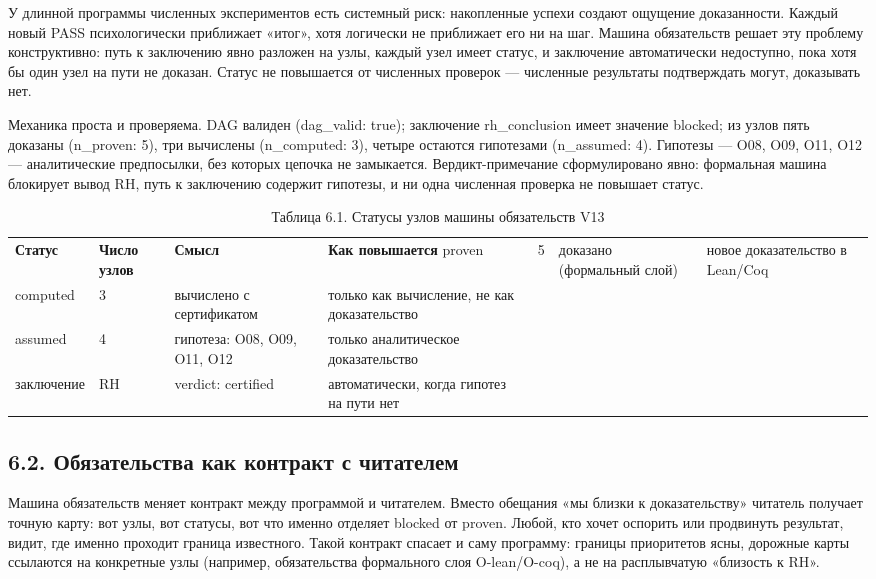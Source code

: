 \documentclass[11pt,a4paper]{article}
\begin{document}
У длинной программы численных экспериментов есть системный риск: накопленные успехи создают ощущение доказанности. Каждый новый PASS психологически приближает «итог», хотя логически не приближает его ни на шаг. Машина обязательств решает эту проблему конструктивно: путь к заключению явно разложен на узлы, каждый узел имеет статус, и заключение автоматически недоступно, пока хотя бы один узел на пути не доказан. Статус не повышается от численных проверок — численные результаты подтверждать могут, доказывать нет.

Механика проста и проверяема. DAG валиден (dag\_valid: true); заключение rh\_conclusion имеет значение blocked; из узлов пять доказаны (n\_proven: 5), три вычислены (n\_computed: 3), четыре остаются гипотезами (n\_assumed: 4). Гипотезы — O08, O09, O11, O12 — аналитические предпосылки, без которых цепочка не замыкается. Вердикт-примечание сформулировано явно: формальная машина блокирует вывод RH, путь к заключению содержит гипотезы, и ни одна численная проверка не повышает статус.

\begin{table}[htbp]\centering\small
\caption{Таблица 6.1. Статусы узлов машины обязательств V13}
\begin{tabular}{p{} p{} p{} p{}}
\toprule
\textbf{Статус} & \textbf{Число узлов} & \textbf{Смысл} & \textbf{Как повышается}
\midrule
proven & 5 & доказано (формальный слой) & новое доказательство в Lean/Coq \\
computed & 3 & вычислено с сертификатом & только как вычисление, не как доказательство \\
assumed & 4 & гипотеза: O08, O09, O11, O12 & только аналитическое доказательство \\
заключение & RH & verdict: certified & автоматически, когда гипотез на пути нет \\
\bottomrule
\end{tabular}
\end{table}

\subsection{6.2. Обязательства как контракт с читателем}

Машина обязательств меняет контракт между программой и читателем. Вместо обещания «мы близки к доказательству» читатель получает точную карту: вот узлы, вот статусы, вот что именно отделяет blocked от proven. Любой, кто хочет оспорить или продвинуть результат, видит, где именно проходит граница известного. Такой контракт спасает и саму программу: границы приоритетов ясны, дорожные карты ссылаются на конкретные узлы (например, обязательства формального слоя O-lean/O-coq), а не на расплывчатую «близость к RH».
\end{document}
